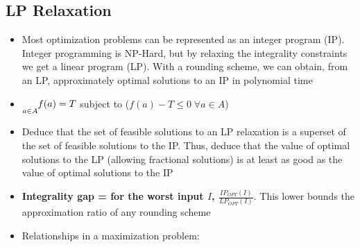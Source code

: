 \documentclass[20pt,a4paper,landscape]{extarticle}
\let\max\relax
\DeclareMathOperator*{\max}{max\:}
\let\min\relax
\DeclareMathOperator*{\min}{min\:}
\begin{document}
\begin{flushleft}
\subsection{LP Relaxation}
\begin{itemize}
\item Most optimization problems can be represented as an integer program (IP). Integer programming is NP-Hard, but by relaxing the integrality constraints we get a linear program (LP). With a rounding scheme, we can obtain, from an LP, approximately optimal solutions to an IP in polynomial time
\item $\min\underset{a \in A}{\max}f(a) = \min T$ subject to ($f(a) - T \leq 0 \; \forall a \in A$)
\item Deduce that the set of feasible solutions to an LP relaxation is a superset of the set of feasible solutions to the IP. Thus, deduce that the value of optimal solutions to the LP (allowing fractional solutions) is at least as good as the value of optimal solutions to the IP
\item \textbf{Integrality gap = for the worst input $I$, $\frac{IP_{OPT}(I)}{LP_{OPT}(I)}$}. This lower bounds the approximation ratio of any rounding scheme
\item Relationships in a maximization problem:
\end{itemize}
\clearpage

\end{flushleft}
\end{document}
